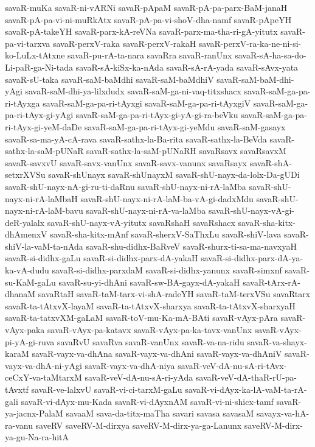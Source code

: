 {savaR-muKa
savaR-ni-vARNi
savaR-pApaM
savaR-pA-pa-parx-BaM-janaH
savaR-pA-pa-vi-ni-muRkAtx
savaR-pA-pa-vi-shoV-dha-namf
savaR-pApeYH
savaR-pA-takeYH
savaR-parx-kA-reVNa
savaR-parx-ma-tha-ri-gA-yitutx
savaR-pa-vi-tarxva
savaR-perxV-raka
savaR-perxV-rakaH
savaR-perxV-ra-ka-ne-ni-si-ko-LuLx-tAtxne
savaR-pu-rA-ta-nara
savaRra
savaR-ranUnx
savaR-sA-ha-sa-do-Li-paR-ga-Ni-tada
savaR-sA-kiSx-ka-nAda
savaR-sA-rA-yada
savaR-sAvx-yata
savaR-sU-taka
savaR-saM-baMdhi
savaR-saM-baMdhiV
savaR-saM-baM-dhi-yAgi
savaR-saM-dhi-ya-lilxdudx
savaR-saM-ga-ni-vaq-titxshacx
savaR-saM-ga-pa-ri-tAyxga
savaR-saM-ga-pa-ri-tAyxgi
savaR-saM-ga-pa-ri-tAyxgiV
savaR-saM-ga-pa-ri-tAyx-gi-yAgi
savaR-saM-ga-pa-ri-tAyx-gi-yA-gi-ra-beVku
savaR-saM-ga-pa-ri-tAyx-gi-yeM-daDe
savaR-saM-ga-pa-ri-tAyx-gi-yeMdu
savaR-saM-gasayx
savaR-sa-ma-yA-cA-rava
savaR-sathx-la-Ba-rita
savaR-sathx-la-BeVda
savaR-sathx-la-saM-pUNaR
savaR-sathx-la-saM-pUNaRH
savaRsavx
savaRsavxM
savaR-savxvU
savaR-savx-vanUnx
savaR-savx-vanunx
savaRsayx
savaR-shA-setxrXVSu
savaR-shUnayx
savaR-shUnayxM
savaR-shU-nayx-da-lolx-Da-gUDi
savaR-shU-nayx-nA-gi-ru-ti-daRnu
savaR-shU-nayx-ni-rA-laMba
savaR-shU-nayx-ni-rA-laMbaH
savaR-shU-nayx-ni-rA-laM-ba-vA-gi-dadxMdu
savaR-shU-nayx-ni-rA-laM-bavu
savaR-shU-nayx-ni-rA-va-laMba
savaR-shU-nayx-vA-gi-deR-yalalx
savaR-shU-nayx-vA-yitutx
savaRshaH
savaRshacx
savaR-sha-kitx-dhAmenxV
savaR-sha-kitx-mAnf
savaR-sherxV-SaThxLu
savaR-shiV-lava
savaR-shiV-la-vaM-ta-nAda
savaR-shu-didhx-BaRveV
savaR-shurx-ti-sa-ma-navxyaH
savaR-si-didhx-gaLu
savaR-si-didhx-parx-dA-yakaH
savaR-si-didhx-parx-dA-ya-ka-vA-dudu
savaR-si-didhx-parxdaM
savaR-si-didhx-yanunx
savaR-simxnf
savaR-su-KaM-gaLu
savaR-su-yi-dhAni
savaR-sw-BA-gayx-dA-yakaH
savaR-tArx-rA-dhanaM
savaRtaH
savaR-taM-tarx-vi-shA-radeYH
savaR-taM-terxVSu
savaRtarx
savaR-ta-tAtxvX-layaM
savaR-ta-tAtxvX-sharxya
savaR-ta-tAtxvX-sharxyaH
savaR-ta-tatxvXM-gaLaM
savaR-toV-mu-Ka-mA-BAti
savaR-vAyx-pAra
savaR-vAyx-paka
savaR-vAyx-pa-katavx
savaR-vAyx-pa-ka-tavx-vanUnx
savaR-vAyx-pi-yA-gi-ruva
savaRvU
savaRva
savaR-vanUnx
savaR-va-na-ridu
savaR-va-shayx-karaM
savaR-vayx-va-dhAna
savaR-vayx-va-dhAni
savaR-vayx-va-dhAniV
savaR-vayx-va-dhA-ni-yAgi
savaR-vayx-va-dhA-niya
savaR-veV-dA-nu-sA-ri-tAvx-ceCxY-va-taMtarxM
savaR-veV-dA-nu-sA-ri-yAda
savaR-veV-dA-thaR-rU-pa-tAvxtf
savaR-ve-lalxvU
savaR-vi-ci-tarxM-gaLu
savaR-vi-dAyx-ka-lA-vaM-ta-rA-gali
savaR-vi-dAyx-mu-Kada
savaR-vi-dAyxnAM
savaR-vi-ni-shicx-tamf
savaR-ya-jacnx-PalaM
savaaM
sava-da-titx-maTha
savari
savasa
savasaM
savayx-va-hA-ra-vanu
saveRV
saveRV-M-dirxya
saveRV-M-dirx-ya-ga-Lanunx
saveRV-M-dirx-ya-gu-Na-ra-hitA
}

